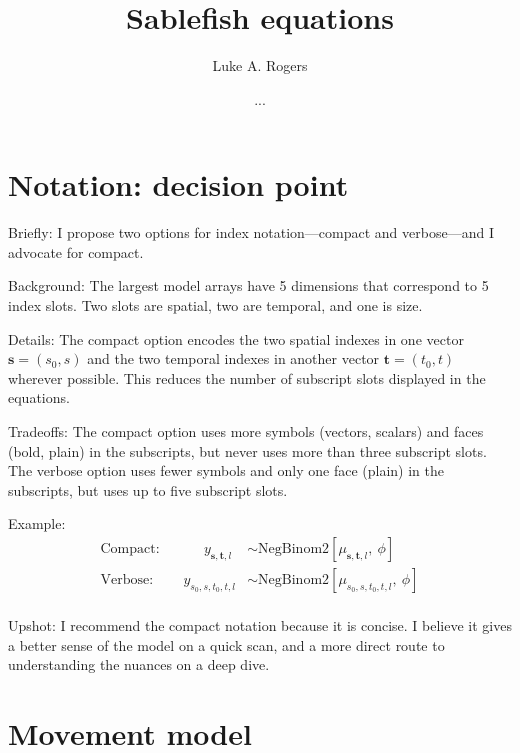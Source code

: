 \documentclass{article}
\title{Sablefish equations }
\author[1]{Luke A. Rogers}
\author[]{...}
\affil[1]{Pacific Biological Station, Fisheries and Oceans Canada, Nanaimo, BC, V9T 6N7, Canada}
\begin{document}
\maketitle
\linenumbers
\setcounter{secnumdepth}{0}

\section{Notation: decision point}

Briefly: I propose two options for index notation---compact and verbose---and I advocate for compact.
\newline

\noindent Background: The largest model arrays have 5 dimensions that correspond to 5 index slots. Two slots are spatial, two are temporal, and one is size.
\newline

\noindent Details: The compact option encodes the two spatial indexes in one vector $\boldsymbol{s} = \left( s_0,s \right)$ and the two temporal indexes in another vector $\boldsymbol{t} = \left( t_0, t \right)$ wherever possible. This reduces the number of subscript slots displayed in the equations.
\newline

\noindent Tradeoffs: The compact option uses more symbols (vectors, scalars) and faces (bold, plain) in the subscripts, but never uses more than three subscript slots. The verbose option uses fewer symbols and only one face (plain) in the subscripts, but uses up to five subscript slots.
\newline

\noindent Example:
\begin{align}
  \mathrm{Compact:}\qquad \quad y_{\boldsymbol{s}, \boldsymbol{t},l} &\sim \mathrm{NegBinom2} \!
     \left[\mu_{\boldsymbol{s}, \boldsymbol{t},l} \mathrm{,} \: \phi \right] \\
  \mathrm{Verbose:}\qquad y_{s_0,s,t_0,t,l} &\sim \mathrm{NegBinom2} \!
     \left[\mu_{s_0,s,t_0,t,l} \mathrm{,} \: \phi \right] \\
\end{align}

\noindent Upshot: I recommend the compact notation because it is concise. I believe it gives a better sense of the model on a quick scan, and a more direct route to understanding the nuances on a deep dive.

\newpage

\section{Movement model}
\end{document}
